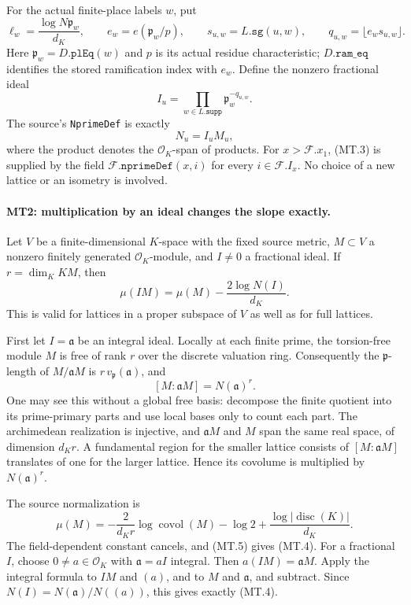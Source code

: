 For the actual finite-place labels $w$, put
\[
 \ell_w=\frac{\log N\mathfrak p_w}{d_K},\qquad
 e_w=e(\mathfrak p_w/p),\qquad s_{u,w}=L.\texttt{sg}(u,w),
 \qquad q_{u,w}=\lfloor e_ws_{u,w}\rfloor.
\]
Here $\mathfrak p_w=D.\texttt{plEq}(w)$ and $p$ is its actual residue
characteristic; $D.\texttt{ram\_eq}$ identifies the stored ramification
index with $e_w$.  Define the nonzero fractional ideal
\[
       I_u=\prod_{w\in L.\texttt{supp}}\mathfrak p_w^{-q_{u,w}}.
                                                                  \tag{MT.2}
\]
The source's \texttt{NprimeDef} is exactly
\[
                N_u=I_uM_u,                                      \tag{MT.3}
\]
where the product denotes the $\mathcal O_K$-span of products.
For $x>\mathcal F.x_1$, (MT.3) is supplied by the field
$\mathcal F.\texttt{nprimeDef}(x,i)$ for every $i\in\mathcal F.I_x$.
No choice of a new lattice or an isometry is involved.

\paragraph{MT2: multiplication by an ideal changes the slope exactly.}
\label{claim:MT2}
Let $V$ be a finite-dimensional $K$-space with the fixed source metric,
$M\subset V$ a nonzero finitely generated $\mathcal O_K$-module, and
$I\ne0$ a fractional ideal.  If $r=\dim_K KM$, then
\[
       \boxed{\quad\mu(IM)=\mu(M)-\frac{2\log N(I)}{d_K}.\quad}     \tag{MT.4}
\]
This is valid for lattices in a proper subspace of $V$ as well as for
full lattices.

First let $I=\mathfrak a$ be an integral ideal.  Locally at each finite
prime, the torsion-free module $M$ is free of rank $r$ over the discrete
valuation ring.  Consequently the $\mathfrak p$-length of
$M/\mathfrak a M$ is $r\,v_{\mathfrak p}(\mathfrak a)$, and
\[
                  [M:\mathfrak a M]=N(\mathfrak a)^r.             \tag{MT.5}
\]
One may see this without a global free basis: decompose the finite
quotient into its prime-primary parts and use local bases only to count
each part.  The archimedean realization is injective, and
$\mathfrak a M$ and $M$ span the same real space, of dimension $d_Kr$.
A fundamental region for the smaller lattice consists of
$[M:\mathfrak a M]$ translates of one for the larger lattice.  Hence
its covolume is multiplied by $N(\mathfrak a)^r$.

The source normalization is
\[
 \mu(M)=-\frac{2}{d_Kr}\log\operatorname{covol}(M)
              -\log2+\frac{\log|\operatorname{disc}(K)|}{d_K}.
                                                                  \tag{MT.6}
\]
The field-dependent constant cancels, and (MT.5) gives (MT.4).
For a fractional $I$, choose $0\ne a\in\mathcal O_K$ with
$\mathfrak a=aI$ integral.  Then $a(IM)=\mathfrak a M$.
Apply the integral formula to $IM$ and $(a)$, and to $M$ and
$\mathfrak a$, and subtract.  Since
$N(I)=N(\mathfrak a)/N((a))$, this gives exactly (MT.4).

